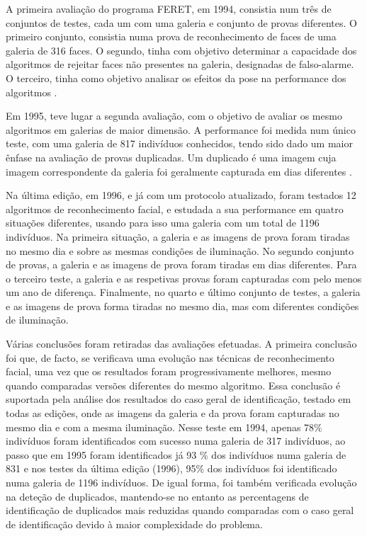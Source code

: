 A primeira avaliação do programa FERET, em 1994, consistia num três de conjuntos de testes, cada um com uma galeria e conjunto de provas diferentes. O primeiro conjunto, consistia numa prova de reconhecimento de faces de uma galeria de 316 faces. O segundo, tinha com objetivo determinar a capacidade dos algoritmos de rejeitar faces não presentes na galeria, designadas de falso-alarme. O terceiro, tinha como objetivo analisar os efeitos da pose na performance dos algoritmos \citep{Phillips2000}.

Em 1995, teve lugar a segunda avaliação, com o objetivo de  avaliar os mesmo algoritmos em galerias de maior dimensão. A performance foi medida num único teste, com uma galeria de 817 indivíduos conhecidos, tendo sido dado um maior ênfase na avaliação de provas duplicadas. Um duplicado é uma imagem cuja imagem correspondente da galeria foi geralmente capturada em dias diferentes  \citep{Phillips2000}.

Na última edição, em 1996, e já com um protocolo atualizado, foram testados 12 algoritmos de reconhecimento facial, e estudada a sua performance em quatro situações diferentes, usando para isso uma galeria com um total de 1196 indivíduos. Na primeira situação, a galeria e as imagens de prova foram tiradas no mesmo dia e sobre as mesmas condições de iluminação. No segundo conjunto de provas, a galeria e as imagens de prova foram tiradas em dias diferentes. Para o terceiro teste, a galeria e as respetivas provas foram capturadas com pelo menos um ano de diferença. Finalmente, no quarto e último conjunto de testes, a galeria e as imagens de prova forma tiradas no mesmo dia, mas com diferentes condições de iluminação.

Várias conclusões foram retiradas das avaliações efetuadas. A primeira conclusão foi que, de facto, se verificava uma evolução nas técnicas de reconhecimento facial, uma vez que os resultados foram progressivamente melhores, mesmo quando comparadas versões diferentes do mesmo algoritmo. Essa conclusão é suportada pela análise dos resultados do caso geral de identificação, testado em todas as edições, onde as imagens da galeria e da prova foram capturadas no mesmo dia e com a mesma iluminação. Nesse teste em 1994, apenas 78\% indivíduos foram identificados com sucesso numa galeria de 317 indivíduos, ao passo que em 1995 foram identificados já 93 \% dos indivíduos numa galeria de 831 e nos testes da última edição (1996), 95\% dos indivíduos foi identificado numa galeria de 1196 indivíduos. De igual forma, foi também verificada evolução na deteção de duplicados, mantendo-se no entanto as percentagens de identificação de duplicados mais reduzidas quando comparadas com o caso geral de identificação devido à maior complexidade do problema.

